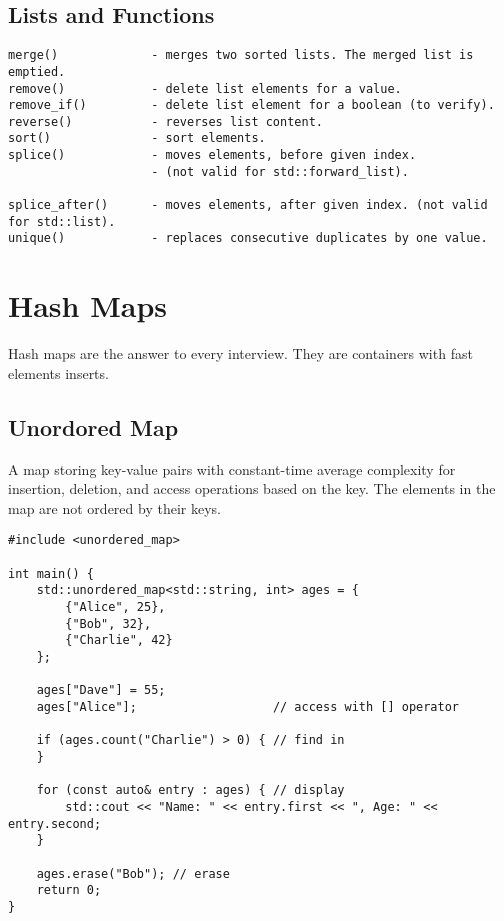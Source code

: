 \documentclass[openany]{report}
\begin{document}
\subsection{Lists and Functions}

\begin{verbatim}
merge()             - merges two sorted lists. The merged list is emptied.
remove()            - delete list elements for a value.
remove_if()         - delete list element for a boolean (to verify).
reverse()           - reverses list content.
sort()              - sort elements.
splice()            - moves elements, before given index.
                    - (not valid for std::forward_list).

splice_after()      - moves elements, after given index. (not valid for std::list).
unique()            - replaces consecutive duplicates by one value.
\end{verbatim}

\section{Hash Maps}

Hash maps are the answer to every interview. They are containers with fast elements inserts.

\subsection{Unordored Map}

A map storing key-value pairs with constant-time average complexity for insertion,
deletion, and access operations based on the key.
The elements in the map are not ordered by their keys.

\begin{verbatim}
#include <unordered_map>

int main() {
    std::unordered_map<std::string, int> ages = {
        {"Alice", 25},
        {"Bob", 32},
        {"Charlie", 42}
    };

    ages["Dave"] = 55;
    ages["Alice"];                   // access with [] operator

    if (ages.count("Charlie") > 0) { // find in
    }

    for (const auto& entry : ages) { // display
        std::cout << "Name: " << entry.first << ", Age: " << entry.second;
    }

    ages.erase("Bob"); // erase
    return 0;
}
\end{verbatim}
\end{document}
